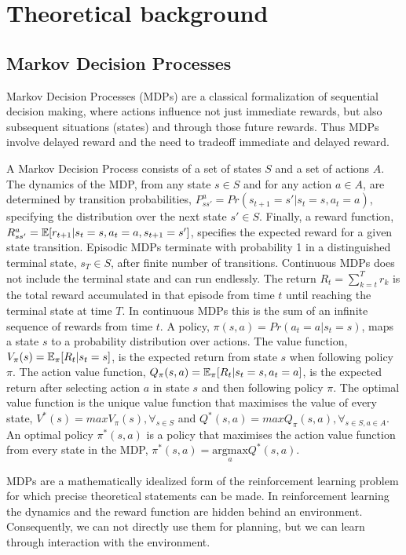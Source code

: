 \section{Theoretical background}

\subsection{Markov Decision Processes}

Markov Decision Processes (MDPs) are a classical formalization of sequential decision making, where actions influence not just immediate rewards, but also subsequent situations (states) and through those future rewards. Thus MDPs involve delayed reward and the need to tradeoff immediate and delayed reward.

A Markov Decision Process consists of a set of states $S$ and a set of actions $A$. The dynamics of the MDP, from any state $s \in S$ and for any action $a \in A$, are determined by transition probabilities, $P^a_{ss'} = Pr(s_{t+1} = s' | s_t = s, a_t = a)$, specifying the distribution over the next state $s' \in S$. Finally, a reward function, $R^a_{ss'} = \operatorname{\mathbb{E}}[r_{t+1} | s_t = s, a_t = a, s_{t+1} = s']$, specifies the expected reward for a given state transition.
Episodic MDPs terminate with probability 1 in a distinguished terminal state, $s_T \in S$, after finite number of transitions. Continuous MDPs does not include the terminal state and can run endlessly.
The return $R_t = \sum^T_{k=t}r_k$ is the total reward accumulated in that episode from time $t$ until reaching the terminal state at time $T$. In continuous MDPs this is the sum of an infinite sequence of rewards from time $t$.
A policy, $\pi(s, a) = Pr(a_t = a | s_t = s)$, maps a state $s$ to a probability distribution over actions.
The value function, $V_\pi(s) = \operatorname{\mathbb{E}}_\pi[R_t | s_t = s]$, is the expected return from state $s$ when following policy $\pi$.
The action value function, $Q_\pi(s, a) = \operatorname{\mathbb{E}}_\pi[R_t | s_t = s, a_t = a]$, is the expected return after selecting action $a$ in state $s$ and then following policy $\pi$.
The optimal value function is the unique value function that maximises the value of every state, $V^*(s) = maxV_\pi(s), \forall_{s \in S}$ and $Q^*(s, a) = maxQ_\pi(s, a), \forall_{s \in S, a \in A}$. An optimal policy $\pi^*(s, a)$ is a policy that maximises the action value function from every state in the MDP, $\pi^*(s, a) = \underset{a}{\mathrm{argmax}}Q^*(s, a)$.

MDPs are a mathematically idealized form of the reinforcement learning problem for which precise theoretical statements can be made. In reinforcement learning the dynamics and the reward function are hidden behind an environment. Consequently, we can not directly use them for planning, but we can learn through interaction with the environment.

